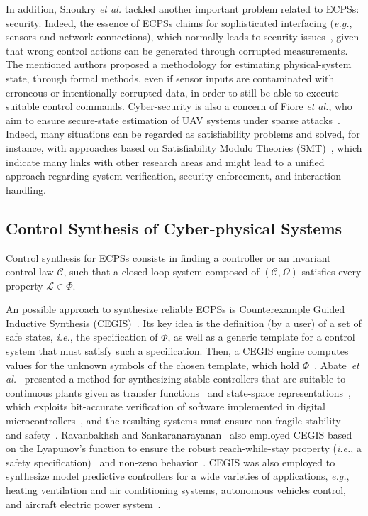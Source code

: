 \documentclass{cta-author}
\begin{document}
In addition, Shoukry {\it et al.} \cite{Shoukry} tackled another important problem related to ECPSs: security. Indeed, the essence of ECPSs claims for sophisticated interfacing ({\it e.g.}, sensors and network connections), which normally leads to security issues~\cite{cpsattack}, given that wrong control actions can be generated through corrupted measurements. The mentioned authors proposed a methodology for estimating physical-system state, through formal methods, even if sensor inputs are contaminated with erroneous or intentionally corrupted data, in order to still be able to execute suitable control commands. Cyber-security is also a concern of Fiore {\it et al.}, who aim to ensure secure-state estimation of UAV systems under sparse attacks~\cite{Fiore17}. Indeed, many situations can be regarded as satisfiability problems and solved, for instance, with approaches based on Satisfiability Modulo Theories (SMT)~\cite{ARAUJO2017,TrindadeDAES2016,Rahman13}, which indicate many links with other research areas and might lead to a unified approach regarding system verification, security enforcement, and interaction handling.

\subsection{Control Synthesis of Cyber-physical Systems}
\label{ssec:synthesis}

Control synthesis for ECPSs consists in finding a controller or an invariant control law $\mathcal{C}$, such that a closed-loop system composed of $(\mathcal{C},\Omega)$ satisfies every property $\mathcal{L}\in \Phi$. 

An possible approach to synthesize reliable ECPSs is Counterexample Guided Inductive Synthesis (CEGIS)~\cite{DBLP:conf/asplos/Solar-LezamaTBSS06}. Its key idea is the definition (by a user) of a set of safe states, {\it i.e.}, the specification of $\Phi$, as well as a generic template for a control system that must satisfy such a specification. Then, a CEGIS engine computes values for the unknown symbols of the chosen template, which hold $\Phi$~\cite{RienerKFB16}. Abate~{\it et al.}~\cite{Abate17,abatecav2017} presented a method for synthesizing stable controllers that are suitable to continuous plants given as transfer functions~\cite{Abate17} and state-space representations~\cite{abatecav2017}, which exploits bit-accurate verification of software implemented in digital microcontrollers~\cite{Bessa16,Bessa17,dsv_spin2015}, and the resulting systems must ensure non-fragile stability~\cite{Abate17} and safety~\cite{abatecav2017}. Ravanbakhsh and Sankaranarayanan~\cite{Ravanbakhsh15,Ravanbakhsh16} also employed CEGIS based on the Lyapunov's function to ensure the robust reach-while-stay property ({\it i.e.}, a safety specification)~\cite{Ravanbakhsh16} and non-zeno behavior~\cite{Ravanbakhsh15}. CEGIS was also employed to synthesize model predictive controllers for a wide varieties of applications, {\it e.g.}, heating ventilation and air conditioning systems, autonomous vehicles control, and aircraft electric power system~\cite{Ghosh05,Rahman13}.
\end{document}
